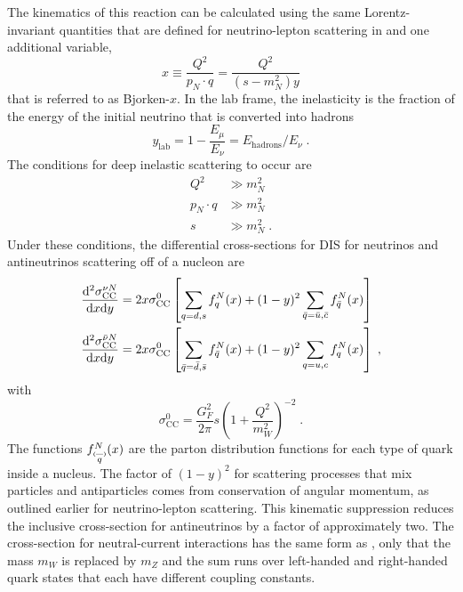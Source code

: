 The kinematics of this reaction can be calculated using the same Lorentz-invariant quantities that are defined for neutrino-lepton scattering in  and one additional variable,
\begin{equation}
    x\equiv \frac{Q^2}{p_N \cdot q} = \frac{Q^2}{(s-m_N^2)y}
\end{equation}
that is referred to as Bjorken-$x$.
In the lab frame, the inelasticity is the fraction of the energy of the initial neutrino that is converted into hadrons
\begin{equation}
    y_\mathrm{lab} = 1 -\frac{E_\mu}{E_\nu} = E_\mathrm{hadrons}/E_\nu\;.
\end{equation}
The conditions for deep inelastic scattering to occur are
\begin{equation}
\begin{aligned}
    Q^2 &\gg m_N^2 \\
    p_N \cdot q &\gg m_N^2 \\
    s &\gg m_N^2\;.
\end{aligned}
\end{equation}
Under these conditions, the differential cross-sections for DIS for neutrinos and antineutrinos scattering off of a nucleon are
\begin{equation}
\begin{aligned}
    \frac{\mathrm{d}^2 \sigma_\mathrm{CC}^{\nu N}}{\mathrm{d} x \mathrm{d} y}
    &= 2x\sigma^0_\mathrm{CC} \left[
        \sum_{q=d,s} f_q^N(x) + (1 - y)^2\sum_{\bar{q}=\bar{u},\bar{c}} f_{\bar{q}}^N(x)
    \right] \\
    \frac{\mathrm{d}^2 \sigma_\mathrm{CC}^{\bar{\nu} N}}{\mathrm{d} x \mathrm{d} y}
    &= 2x\sigma^0_\mathrm{CC} \left[
        \sum_{\bar{q}=\bar{d},\bar{s}} f_{\bar{q}}^N(x) + (1 - y)^2\sum_{q=u,c} f_q^N(x)
    \right]\;,
\end{aligned}\label{eq:ccdis-xsec}
\end{equation}
with
\begin{equation}
    \sigma_\mathrm{CC}^0 = \frac{G_F^2}{2\pi}s \left( 1 + \frac{Q^2}{m_W^2} \right)^{-2}\;.
\end{equation}
The functions $f_{\pbar{q}}^N(x)$ are the parton distribution functions for each type of quark inside a nucleus.
The factor of $(1 - y)^2$ for scattering processes that mix particles and antiparticles comes from conservation of angular momentum, as outlined earlier for neutrino-lepton scattering.
This kinematic suppression reduces the inclusive cross-section for antineutrinos by a factor of approximately two.
The cross-section for neutral-current interactions has the same form as , only that the mass $m_W$ is replaced by $m_Z$ and the sum runs over left-handed and right-handed quark states that each have different coupling constants.
